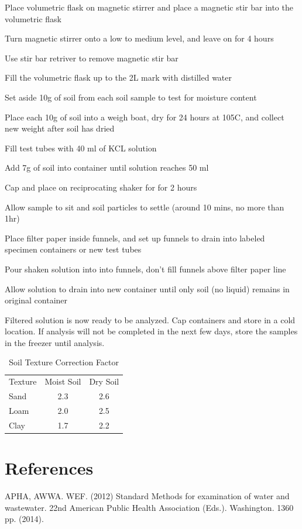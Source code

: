 \documentclass[12pt]{../SOP4_alpha}\usepackage[]{graphicx}\usepackage[]{xcolor}
\begin{document}
\NP Place volumetric flask on magnetic stirrer and place a magnetic stir bar into the volumetric flask 

\NP Turn magnetic stirrer onto a low to medium level, and leave on for 4 hours

\NP Use stir bar retriver to remove magnetic stir bar 

\NP Fill the volumetric flask up to the 2L mark with distilled water 




\NP Set aside 10g of soil from each soil sample to test for moisture content 

\NP Place each 10g of soil into a weigh boat, dry for 24 hours at 105C, and collect new weight after soil has dried




\NP Fill test tubes with 40 ml of KCL solution

\NP Add 7g of soil into container until solution reaches 50 ml

\NP Cap and place on reciprocating shaker for for 2 hours

\NP Allow sample to sit and soil particles to settle (around 10 mins, no more than 1hr)

\NP Place filter paper inside funnels, and set up funnels to drain into labeled specimen containers or new test tubes

\NP Pour shaken solution into into funnels, don't fill funnels above filter paper line 

\NP Allow solution to drain into new container until only soil (no liquid) remains in original container

\NP Filtered solution is now ready to be analyzed. Cap containers and store in a cold location. If analysis will not be completed in the next few days, store the samples in the freezer until analysis.

\begin{table}
\caption{Soil Texture Correction Factor}
\centering
\begin{tabular}{lcc}
Texture     & Moist Soil  & Dry Soil  \\
Sand        &   2.3         &  2.6      \\
Loam        &   2.0       &  2.5      \\
Clay        &   1.7       & 2.2 \\
\end{tabular}
\end{table}


\section{References}

\NP APHA, AWWA. WEF. (2012) Standard Methods for examination of water and wastewater. 22nd American Public Health Association (Eds.). Washington. 1360 pp. (2014).
\end{document}
